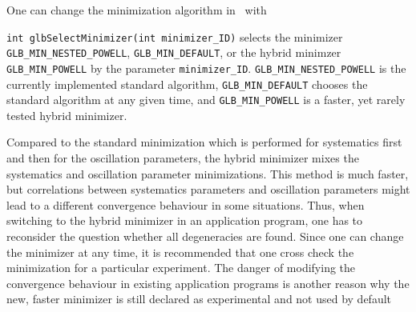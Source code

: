 One can change the minimization algorithm in \GLOBES\ with
\begin{function}
{\tt int glbSelectMinimizer(int minimizer\_ID)} selects the minimizer {\tt GLB\_MIN\_NESTED\_POWELL}, {\tt GLB\_MIN\_DEFAULT}, or the hybrid minimzer {\tt GLB\_MIN\_POWELL} by the parameter {\tt minimizer\_ID}. 
{\tt GLB\_MIN\_NESTED\_POWELL} is the currently implemented standard algorithm, {\tt GLB\_MIN\_DEFAULT} chooses the standard algorithm at any given time, and {\tt GLB\_MIN\_POWELL} is a faster, yet rarely tested hybrid
minimizer.
\end{function}
Compared to the standard minimization which is performed for systematics first and then for the
oscillation parameters, the hybrid minimizer mixes the systematics and oscillation parameter minimizations. 
This method is much faster,
but correlations between systematics parameters and oscillation parameters might lead to a different convergence behaviour in some situations. Thus, when switching to the hybrid minimizer in an application program, one has to reconsider the question whether all degeneracies are found. Since one can change the minimizer at any time, it is recommended that one cross check the minimization for a particular experiment. The danger of modifying the convergence behaviour in existing application programs is another reason why the new, faster minimizer is still declared as experimental and not used by default

